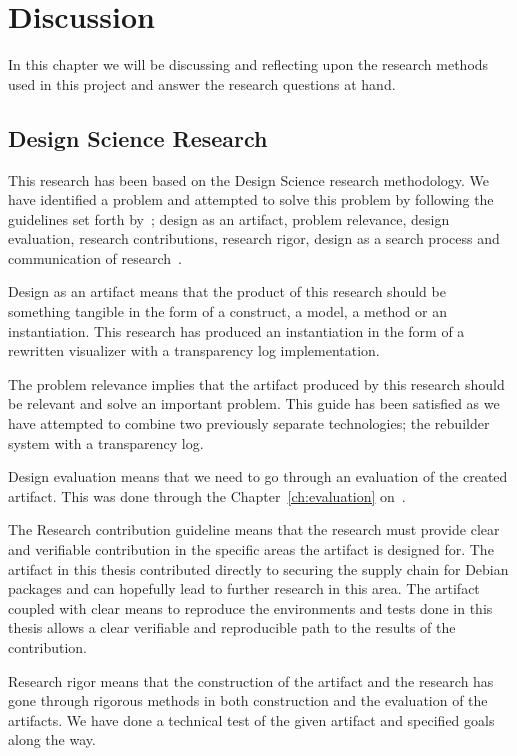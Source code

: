 \documentclass[../Main/thesis.tex]{subfiles}
\begin{document}
\chapter{Discussion}%
\label{ch:discussion}
In this chapter we will be discussing and reflecting upon the research methods
used in this project and answer the research questions at hand.

\section{Design Science Research}%
\label{sec:design_science_research_evaluation}
This research has been based on the Design Science research methodology. We have
identified a problem and attempted to solve this problem by following the
guidelines set forth
by~\citeauthor{Hevner:2004:DSI:2017212.2017217}; design as an artifact, problem
relevance, design evaluation, research contributions, research rigor, design as
a search process and communication of research~\cite{Hevner:2004:DSI:2017212.2017217}.

Design as an artifact means that the product of this research should be
something tangible in the form of a construct, a model, a method or an
instantiation. This research has produced an instantiation in the form of a
rewritten visualizer with a transparency log implementation.

The problem relevance implies that the artifact produced by this research should
be relevant and solve an important problem. This guide has been satisfied as we
have attempted to combine two previously separate technologies; the rebuilder
system with a transparency log.

Design evaluation means that we need to go through an evaluation of the created
artifact. This was done through the Chapter~\ref{ch:evaluation}
on~\pageref{ch:evaluation}.

The Research contribution guideline means that the research must provide clear
and verifiable contribution in the specific areas the artifact is designed for.
The artifact in this thesis contributed directly to securing the supply chain
for Debian packages and can hopefully lead to further research in this area. The
artifact coupled with clear means to reproduce the environments and tests done
in this thesis allows a clear verifiable and reproducible path to the results of
the contribution.

Research rigor means that the construction of the artifact and the research has
gone through rigorous methods in both construction and the evaluation of the
artifacts. We have done a technical test of the given artifact and specified
goals along the way.
\end{document}
